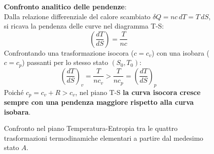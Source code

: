 \begin{figure}[ht]
\centering
\begin{minipage}{0.46\textwidth}
\centering
{}
\end{minipage}\hfill
\begin{minipage}{0.50\textwidth}
\textbf{Confronto analitico delle pendenze}:\\
Dalla relazione differenziale del calore scambiato $\delta Q = n c\,dT = T\,dS$, si ricava la pendenza delle curve nel diagramma T-S:
\begin{equation}
    \left( \frac{dT}{dS} \right) = \frac{T}{n c}
\end{equation}
Confrontando una trasformazione isocora ($c = c_v$) con una isobara ($c = c_p$) passanti per lo stesso stato $(S_0, T_0)$:
\begin{equation}
    \left( \frac{dT}{dS} \right)_v = \frac{T}{n c_v} > \frac{T}{n c_p} = \left( \frac{dT}{dS} \right)_p
\end{equation}
Poiché $c_p = c_v + R > c_v$, nel piano T-S \textbf{la curva isocora cresce sempre con una pendenza maggiore rispetto alla curva isobara}.
\end{minipage}
\caption{Confronto nel piano Temperatura-Entropia tra le quattro trasformazioni termodinamiche elementari a partire dal medesimo stato $A$.}
\end{figure}

